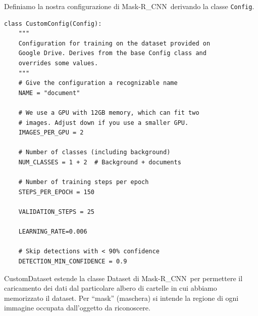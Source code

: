 \documentclass[12pt,a4paper]{article}
\newcommand{\mrcnn}{Mask-R\_CNN}
\begin{document}
Definiamo la nostra configurazione di \mrcnn\ derivando la classe
\texttt{Config}.

\begin{verbatim}
class CustomConfig(Config):
    """
    Configuration for training on the dataset provided on
    Google Drive. Derives from the base Config class and
    overrides some values.
    """
    # Give the configuration a recognizable name
    NAME = "document"

    # We use a GPU with 12GB memory, which can fit two
    # images. Adjust down if you use a smaller GPU.
    IMAGES_PER_GPU = 2

    # Number of classes (including background)
    NUM_CLASSES = 1 + 2  # Background + documents

    # Number of training steps per epoch
    STEPS_PER_EPOCH = 150

    VALIDATION_STEPS = 25

    LEARNING_RATE=0.006

    # Skip detections with < 90% confidence
    DETECTION_MIN_CONFIDENCE = 0.9
\end{verbatim}

CustomDataset estende la classe Dataset di \mrcnn\ per
permettere il caricamento dei dati dal particolare albero di
cartelle in cui abbiamo memorizzato il dataset.
Per ``mask'' (maschera) si intende la regione di ogni
immagine occupata dall'oggetto da riconoscere.
\end{document}
